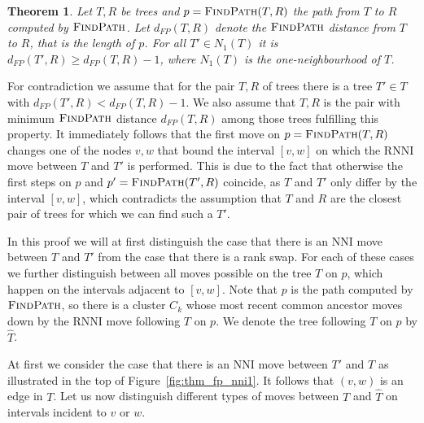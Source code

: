 \documentclass{amsart}
\newtheorem{theorem}{Theorem}
\newcommand{\rnni}{\mathrm{RNNI}}
\newcommand{\findpath}{\textsc{FindPath}}
\newcommand{\nni}{\mathrm{NNI}}
\begin{document}
\begin{theorem}
    Let $T,R$ be trees and $p = \findpath(T,R)$ the path from $T$ to $R$ computed by $\findpath$.
    Let $d_{FP}(T,R)$ denote the $\findpath$ distance from $T$ to $R$, that is the length of $p$.
    For all $T' \in N_1(T)$ it is $d_{FP}(T',R) \geq d_{FP}(T,R) - 1$, where $N_1(T)$ is the one-neighbourhood of $T$.
\end{theorem}

\proof
For contradiction we assume that for the pair $T,R$ of trees there is a tree $T' \in T$ with $d_{FP}(T',R) < d_{FP}(T,R) - 1$.
We also assume that $T,R$ is the pair with minimum $\findpath$ distance $d_{FP}(T,R)$ among those trees fulfilling this property.
It immediately follows that the first move on $p = \findpath(T,R)$ changes one of the nodes $v,w$ that bound the interval $[v,w]$ on which the $\rnni$ move between $T$ and $T'$ is performed.
This is due to the fact that otherwise the first steps on $p$ and $p' = \findpath(T',R)$ coincide, as $T$ and $T'$ only differ by the interval $[v,w]$, which contradicts the assumption that $T$ and $R$ are the closest pair of trees for which we can find such a $T'$.

In this proof we will at first distinguish the case that there is an $\nni$ move between $T$ and $T'$ from the case that there is a rank swap.
For each of these cases we further distinguish between all moves possible on the tree $T$ on $p$, which happen on the intervals adjacent to $[v,w]$.
Note that $p$ is the path computed by $\findpath$, so there is a cluster $C_k$ whose most recent common ancestor moves down by the $\rnni$ move following $T$ on $p$.
We denote the tree following $T$ on $p$ by $\hat T$.

At first we consider the case that there is an $\nni$ move between $T'$ and $T$ as illustrated in the top of Figure~\ref{fig:thm_fp_nni1}.
It follows that $(v,w)$ is an edge in $T$.
Let us now distinguish different types of moves between $T$ and $\hat T$ on intervals incident to $v$ or $w$.
\end{document}
